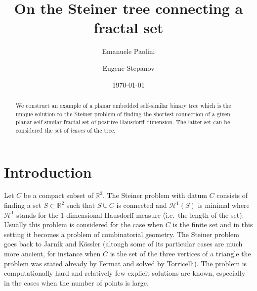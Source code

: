 \documentclass{amsart}
\author[Paolini]{Emanuele Paolini}
\author[Stepanov]{Eugene Stepanov}
\date{\today}
\title{On the Steiner tree connecting a fractal set}
\newcommand{\RR}{\mathbb R}
\renewcommand{\H}{\mathcal H}
\renewcommand{\H}{\mathcal{H}}
\theoremstyle{definition}
\theoremstyle{remark}
\begin{document}
\begin{abstract}
We construct an example of a planar embedded self-similar binary tree  
which is the unique solution to the Steiner problem of finding 
the shortest connection of a given planar self-similar fractal set 
of positive Hausdorff dimension.
The latter set can be considered the set of \emph{leaves} of the tree.
\end{abstract}

\maketitle

\section{Introduction}

Let $C$ be a compact subset of $\RR^2$.
The Steiner problem with datum $C$ consists of finding a set $S\subset \RR^2$ 
such that $S\cup C$ is connected and $\H^1(S)$ is minimal where $\H^1$ stands 
for the $1$-dimensional Hausdorff measure (i.e.\ the length of the set).
Usually this problem is considered for the case when $C$ is the finite 
set and in this setting it becomes a problem of combinatorial geometry. 
The Steiner problem goes back to Jarník and Kössler \cite{JarKos34} 
(altough some of its particular cases are much more ancient, for instance 
when $C$ is the set of the three vertices of a triangle the problem was 
stated already by Fermat and solved by Torricelli).
The problem is computationally hard and relatively few explicit solutions 
are known, especially in the cases when the number of points is large.
\end{document}
